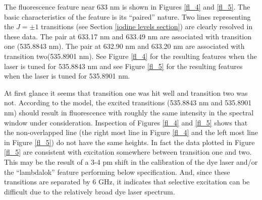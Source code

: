 

The fluorescence feature near 633 nm is shown in Figures \ref{fl_4} and \ref{fl_5}. The basic characteristics of the feature is its ``paired'' nature. Two lines representing the $J=\pm1$ transitions (see Section \ref{iodine levels section}) are clearly resolved in these data. The pair at 633.17 nm and 633.49 nm are associated with transition one (535.8843 nm). The pair at 632.90 nm and 633.20 nm are associated with transition two(535.8901 nm). See Figure \ref{fl_4} for the resulting features when the laser is tuned for 535.8843 nm and see Figure \ref{fl_5} for the resulting features when the laser is tuned for 535.8901 nm.

At first glance it seems that transition one was hit well and transition two was not. According to the model, the excited transitions (535.8843 nm and 535.8901 nm) should result in fluorescence with roughly the same intensity in the spectral window under consideration. Inspection of Figures \ref{fl_4} and \ref{fl_5} shows that the non-overlapped line (the right most line in Figure \ref{fl_4} and the left most line in Figure \ref{fl_5}) do not have the same heights. In fact the data plotted in Figure \ref{fl_5} are consistent with excitation somewhere between transition one and two. This may be the result of a 3-4 pm shift in the calibration of the dye laser and/or the ``lambdalok'' feature performing below specification. And, since these transitions are separated by 6 GHz, it indicates that selective excitation can be difficult due to the relatively broad dye laser spectrum.
